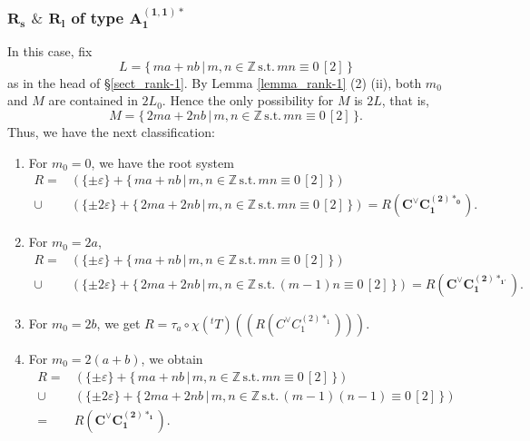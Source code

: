 \documentclass[11pt]{amsart}
\newcommand{\Z}{\mathbb{Z}}
\newcommand{\vep}{\varepsilon}
\begin{document}
\subsubsection{$\mathbf{R_s}$ $\&$ $\mathbf{R_l}$ of type $\mathbf{A_1^{(1,1)\ast}}$}
In this case, fix 
\[ L=\{\, ma+nb\, \vert\, m,n \in \Z\, \text{s.t.} \, mn \equiv 0\, [2]\, \} \]
as in the head of \S \ref{sect_rank-1}. By Lemma \ref{lemma_rank-1} (2) (ii), both $m_0$ and $M$ are contained in $2L_0$. Hence the only possibility for $M$ is $2L$, that is,
\[ M=\{\, 2ma+2nb\, \vert\, m,n \in \Z\, \text{s.t.}\, mn \equiv 0\, [2]\, \}. \]
Thus, we have the next classification:
\begin{enumerate}
\item For $m_0=0$, we have the root system
\begin{align*}
R=
&(\{ \pm\vep \}+\{\, ma+nb\, \vert\, m,n \in \Z\, \text{s.t.} \, mn \equiv 0\, [2]\, \})  \\
\cup
&(\{ \pm 2\vep \}+\{\, 2ma+2nb\, \vert\, m,n \in \Z\, \text{s.t.}\, mn \equiv 0\, [2]\, \})
= R(\mathbf{C^\vee C_1^{(2)\ast_0}}).
\end{align*}
\item For $m_0=2a$, 
\begin{align*}
R=
&(\{ \pm\vep \}+\{\, ma+nb\, \vert\, m,n \in \Z\, \text{s.t.} \, mn \equiv 0\, [2]\, \})  \\
\cup
&(\{ \pm 2\vep \}+\{\, 2ma+2nb\, \vert\, m,n \in \Z\, \text{s.t.}\, (m-1)n \equiv 0\, [2]\, \})
= R(\mathbf{C^\vee C_1^{(2)\ast_{1'}}}).
\end{align*}
\item For $m_0=2b$, we get $R=\tau_a\circ \chi({}^tT)((R(C^\vee C_1^{(2)\ast_1})))$. 
\item For $m_0=2(a+b)$, we obtain
\begin{align*}
R=
&(\{ \pm\vep \}+\{\, ma+nb\, \vert\, m,n \in \Z\, \text{s.t.} \, mn \equiv 0\, [2]\, \})  \\
\cup
&(\{ \pm 2\vep \}+\{\, 2ma+2nb\, \vert\, m,n \in \Z\, \text{s.t.}\, (m-1)(n-1) \equiv 0\, [2]\, \}) \\
= 
&R(\mathbf{C^\vee C_1^{(2)\ast_1}}).
\end{align*}
\end{enumerate}

\end{document}

